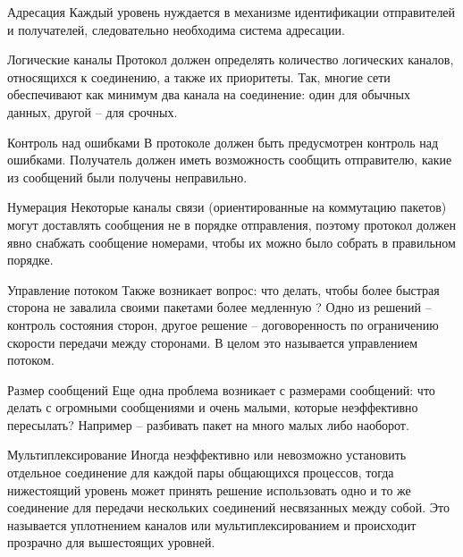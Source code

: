 \documentclass[ignorenonframetext, hyperref={pdftex, unicode}]{beamer}
\begin{document}
\begin{frame}{Адресация}
	Каждый уровень нуждается в механизме идентификации отправителей и получателей,  следовательно необходима система адресации.
\end{frame}

\begin{frame}{Логические каналы}
	Протокол должен определять количество логических каналов,  относящихся к соединению,  а также их приоритеты. Так,  многие сети обеспечивают как минимум два канала на соединение: один для обычных данных,  другой – для срочных.
\end{frame}

\begin{frame}{Контроль над ошибками}
	В протоколе должен быть предусмотрен контроль над ошибками. Получатель должен иметь возможность сообщить отправителю,  какие из сообщений были получены неправильно.
\end{frame}

\begin{frame}{Нумерация}
	Некоторые каналы связи (ориентированные на коммутацию пакетов) могут доставлять сообщения не в порядке отправления,  поэтому протокол должен явно снабжать сообщение номерами,  чтобы их можно было собрать в правильном порядке.
\end{frame}

\begin{frame}{Управление потоком}
	Также возникает вопрос: что делать,  чтобы более быстрая сторона не завалила своими пакетами более медленную ? Одно из решений – контроль состояния сторон,  другое решение – договоренность по ограничению скорости передачи между сторонами. В целом это называется управлением потоком.
\end{frame}

\begin{frame}{Размер сообщений}
Еще одна проблема возникает с размерами сообщений: что делать с огромными сообщениями и очень малыми,  которые неэффективно пересылать?
Например -- разбивать пакет на много малых либо наоборот.
\end{frame}

\begin{frame}{Мультиплексирование}
	Иногда неэффективно или невозможно установить отдельное соединение для каждой пары общающихся процессов,  тогда нижестоящий уровень может принять решение использовать одно и то же соединение для передачи нескольких соединений несвязанных между собой. Это называется уплотнением каналов или мультиплексированием и происходит прозрачно для вышестоящих уровней.
\end{frame}
\end{document}
